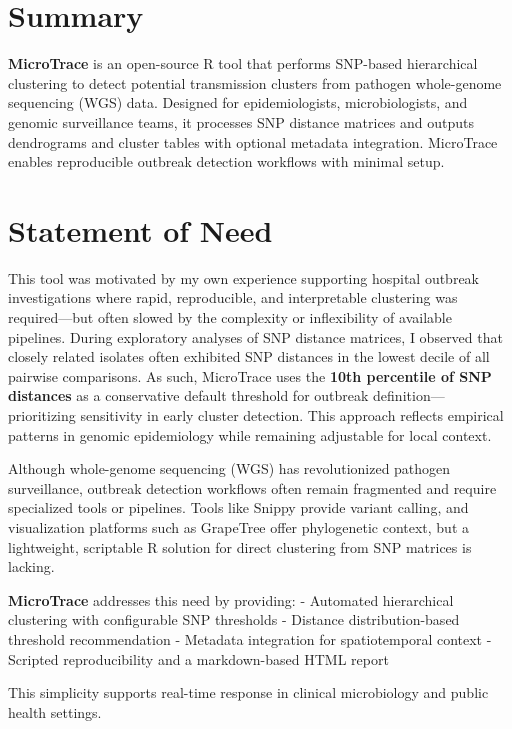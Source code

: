 \section{Summary}\label{summary}

\textbf{MicroTrace} is an open-source R tool that performs SNP-based
hierarchical clustering to detect potential transmission clusters from
pathogen whole-genome sequencing (WGS) data. Designed for
epidemiologists, microbiologists, and genomic surveillance teams, it
processes SNP distance matrices and outputs dendrograms and cluster
tables with optional metadata integration. MicroTrace enables
reproducible outbreak detection workflows with minimal setup.

\section{Statement of Need}\label{statement-of-need}

This tool was motivated by my own experience supporting hospital
outbreak investigations where rapid, reproducible, and interpretable
clustering was required---but often slowed by the complexity or
inflexibility of available pipelines. During exploratory analyses of SNP
distance matrices, I observed that closely related isolates often
exhibited SNP distances in the lowest decile of all pairwise
comparisons. As such, MicroTrace uses the \textbf{10th percentile of SNP
distances} as a conservative default threshold for outbreak
definition---prioritizing sensitivity in early cluster detection. This
approach reflects empirical patterns in genomic epidemiology while
remaining adjustable for local context.

Although whole-genome sequencing (WGS) has revolutionized pathogen
surveillance, outbreak detection workflows often remain fragmented and
require specialized tools or pipelines. Tools like Snippy provide
variant calling, and visualization platforms such as GrapeTree offer
phylogenetic context, but a lightweight, scriptable R solution for
direct clustering from SNP matrices is lacking.

\textbf{MicroTrace} addresses this need by providing: - Automated
hierarchical clustering with configurable SNP thresholds - Distance
distribution-based threshold recommendation - Metadata integration for
spatiotemporal context - Scripted reproducibility and a markdown-based
HTML report

This simplicity supports real-time response in clinical microbiology and
public health settings.

